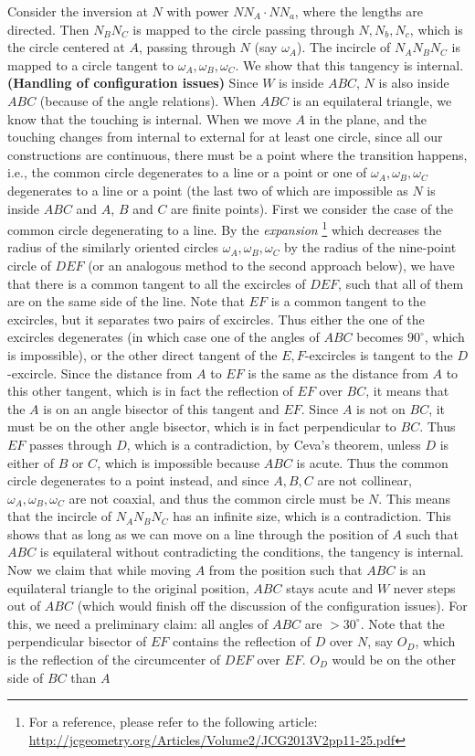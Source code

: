 Consider the inversion at $N$ with power $NN_A \cdot NN_a$, where the lengths are directed. Then $N_BN_C$ is mapped to the circle passing through $N, N_b, N_c$, which is the circle centered at $A$, passing through $N$ (say $\omega_A$). The incircle of $N_AN_BN_C$ is mapped to a circle tangent to $\omega_A, \omega_B, \omega_C$. We show that this tangency is internal. \nl
\textbf{(Handling of configuration issues)} Since $W$ is inside $ABC$, $N$ is also inside $ABC$ (because of the angle relations). When $ABC$ is an equilateral triangle, we know that the touching is internal. When we move $A$ in the plane, and the touching changes from internal to external for at least one circle, since all our constructions are continuous, there must be a point where the transition happens, i.e., the common circle degenerates to a line or a point or one of $\omega_A, \omega_B, \omega_C$ degenerates to a line or a point (the last two of which are impossible as $N$ is inside $ABC$ and $A$, $B$ and $C$ are finite points). First we consider the case of the common circle degenerating to a line. By the \emph{expansion} \footnote{For a reference, please refer to the following article: \url{http://jcgeometry.org/Articles/Volume2/JCG2013V2pp11-25.pdf}} which decreases the radius of the similarly oriented circles $\omega_A, \omega_B, \omega_C$ by the radius of the nine-point circle of $DEF$ (or an analogous method to the second approach below), we have that there is a common tangent to all the excircles of $DEF$, such that all of them are on the same side of the line. Note that $EF$ is a common tangent to the excircles, but it separates two pairs of excircles. Thus either the one of the excircles degenerates (in which case one of the angles of $ABC$ becomes $90^\circ$, which is impossible), or the other direct tangent of the $E, F$-excircles is tangent to the $D$-excircle. Since the distance from $A$ to $EF$ is the same as the distance from $A$ to this other tangent, which is in fact the reflection of $EF$ over $BC$, it means that the $A$ is on an angle bisector of this tangent and $EF$. Since $A$ is not on $BC$, it must be on the other angle bisector, which is in fact perpendicular to $BC$. Thus $EF$ passes through $D$, which is a contradiction, by Ceva's theorem, unless $D$ is either of $B$ or $C$, which is impossible because $ABC$ is acute. Thus the common circle degenerates to a point instead, and since $A, B, C$ are not collinear, $\omega_A, \omega_B, \omega_C$ are not coaxial, and thus the common circle must be $N$. This means that the incircle of $N_AN_BN_C$ has an infinite size, which is a contradiction. This shows that as long as we can move on a line through the position of $A$ such that $ABC$ is equilateral without contradicting the conditions, the tangency is internal. Now we claim that while moving $A$ from the position such that $ABC$ is an equilateral triangle to the original position, $ABC$ stays acute and $W$ never steps out of $ABC$ (which would finish off the discussion of the configuration issues). For this, we need a preliminary claim: all angles of $ABC$ are $> 30^\circ$. Note that the perpendicular bisector of $EF$ contains the reflection of $D$ over $N$, say $O_D$, which is the reflection of the circumcenter of $DEF$ over $EF$. $O_D$ would be on the other side of $BC$ than $A$ 